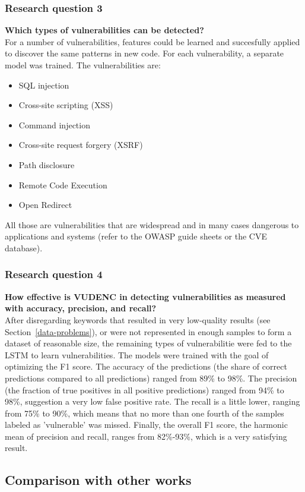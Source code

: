 \documentclass[
a4paper,
pagesize,
pdftex,
12pt,
twoside, %
BCOR=5mm, %
ngerman,
fleqn,
final,
]{scrartcl}
\begin{document}
	\subsubsection{Research question 3}
	\textbf{Which types of vulnerabilities can be detected?}\\
	For a number of vulnerabilities, features could be learned and succesfully applied to discover the same patterns in new code. For each vulnerability, a separate model was trained. The vulnerabilities are:
	\begin{itemize}
		\item SQL injection
		\item Cross-site scripting (XSS)
		\item Command injection
		\item Cross-site request forgery (XSRF)
		\item Path disclosure
		\item Remote Code Execution
		\item Open Redirect
	\end{itemize}
	All those are vulnerabilities that are widespread and in many cases dangerous to applications and systems (refer  to the OWASP guide sheets or the CVE database). 
	
	\subsubsection{Research question 4}
	\textbf{How effective is VUDENC in detecting vulnerabilities as measured with accuracy, precision, and recall? }\\
	After disregarding keywords that resulted in very low-quality results (see Section~\ref{data-problems}), or were not represented in enough samples to form a dataset of reasonable size, the remaining types of vulnerabilitie were fed to the LSTM to learn vulnerabilities. The models were trained with the goal of optimizing the F1 score. The accuracy of the predictions (the share of correct predictions compared to all predictions) ranged from 89\% to 98\%. The precision (the fraction of true positives in all positive predictions) ranged from 94\% to 98\%, suggestion a very low false positive rate. The recall is a little lower, ranging from 75\% to 90\%, which means that no more than one fourth of the samples labeled as 'vulnerable' was missed. Finally, the overall F1 score, the harmonic mean of precision and recall, ranges from 82\%-93\%, which is a very satisfying result.
	
	\subsection{Comparison with other works}
	
\end{document}

